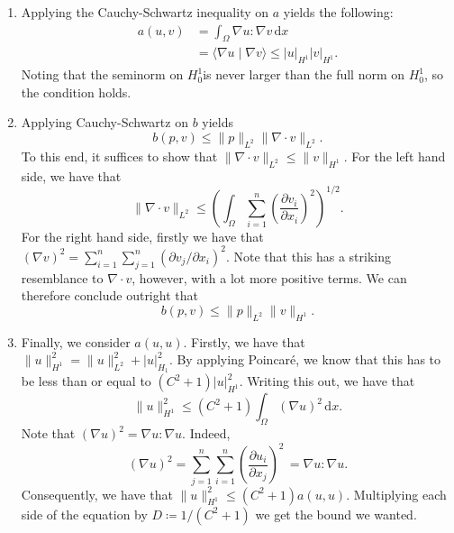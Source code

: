 \documentclass[twocolumn, article]{memoir}
\begin{document}
\begin{enumerate}[wide, label=\roman*)]
    \item Applying the Cauchy-Schwartz inequality on \( a \) yields the following:
\begin{align*}
    a(u, v) &= \int_\Omega \nabla u : \nabla v \, \mathrm{d}x \\
            &= \langle \nabla u \mid \nabla v \rangle \leq |u|_{H^1}|v|_{H^1}.
\end{align*}
Noting that the seminorm on \( H^1_0 \)is never larger than the full norm on \(
H^1_0\), so the condition holds. 
\item Applying Cauchy-Schwartz on \( b \) yields
\begin{equation*}
    b(p, v) \leq \| p \|_{L^2} \| \nabla \cdot v\|_{L^2}.
\end{equation*}
To this end, it suffices to show that \( \|\nabla \cdot v \|_{L^2} \leq \| v
\|_{H^1} \). For the left hand side, we have that
\begin{equation*}
    \|\nabla \cdot v \|_{L^2} \leq \left( \int_\Omega \sum^{n}_{i=1} \left( \frac{\partial v_i}{\partial x_i} \right)^2 \right)^{1/2}.
\end{equation*}
For the right hand side, firstly we have that
\((\nabla v)^2 = \sum^{n}_{i=1} \sum^{n}_{j=1} \left( \partial v_j / \partial
x_i\right)^2 \). Note that this has a striking resemblance to \( \nabla \cdot v
\), however, with a lot more positive terms. We can therefore conclude outright that
\begin{equation*}
    b(p, v) \leq \|p\|_{L^2}\|v\|_{H^1}.
\end{equation*}
\item Finally, we consider \(a(u, u)\). Firstly, we have that \(\| u \|_{H^1}^2 = \|u
\|_{L^2}^2 + |u|_{H_1}^2\). By applying Poincar\'e, we know that this has to be
less than or equal to \((C^2 + 1)|u|_{H^1}^2\). Writing this out, we have that
\begin{equation*}
    \|u\|^2_{H^1} \leq (C^2 + 1)\int_\Omega (\nabla u)^2 \, \mathrm{d}x.
\end{equation*}
Note that \( (\nabla u)^2 = \nabla u : \nabla u \). Indeed, 
\begin{equation*}
    (\nabla u)^2 = \sum_{j=1}^n \sum_{i=1}^n \left(\frac{\partial u_i}{\partial x_j}\right)^2
    \, = \nabla u : \nabla u.
\end{equation*}
Consequently, we have that \(\|u\|^2_{H^1} \leq (C^2 + 1) a(u, u)\).
Multiplying each side of the equation by \(D \coloneqq 1 / (C^2 + 1)\) we get
the bound we wanted.
\end{enumerate}
\end{document}
